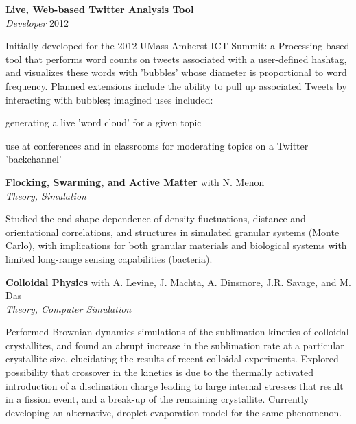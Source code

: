 \documentclass[10pt]{article}
\newcommand{\blankline}{\quad\pagebreak[3]}
\newcommand{\halfblankline}{\quad\vspace{-0.5\baselineskip}\pagebreak[3]}
\begin{document}
\blankline

\href{http://dwblair.github.io}{\textbf{Live, Web-based Twitter Analysis Tool }}\\
\emph{Developer} \hfill {2012}

\halfblankline

Initially developed for the 2012 UMass Amherst ICT Summit: a Processing-based tool that performs word counts on tweets associated with a user-defined hashtag, and visualizes these words with 'bubbles' whose diameter is proportional to word frequency. Planned extensions include the ability to pull up associated Tweets by interacting with bubbles; imagined uses included: 
 \begin{innerlist}
        \item generating a live 'word cloud' for a given topic
\item use at conferences and in classrooms for moderating topics on a Twitter 'backchannel' 
\end{innerlist}


\blankline

\href{http://dwblair.github.io}{\textbf{Flocking, Swarming, and Active Matter}} \hfill {with N. Menon} \\
\emph{Theory, Simulation}

\halfblankline

Studied the end-shape dependence of density fluctuations, distance and orientational correlations, and structures in simulated granular systems (Monte Carlo), with implications for both granular materials and biological systems with limited long-range sensing capabilities (bacteria). 

\blankline

\href{http://dwblair.github.io}{\textbf{Colloidal Physics}} \hfill {with A. Levine, J. Machta, A. Dinsmore, J.R. Savage, and M. Das} \\
\emph{Theory, Computer Simulation} 

\halfblankline

Performed Brownian dynamics simulations of the sublimation kinetics of colloidal crystallites, and found an abrupt increase in the sublimation rate at a particular crystallite size, elucidating the results of
recent colloidal experiments. Explored possibility that crossover in the kinetics is due to the thermally activated
introduction of a disclination charge leading to large internal stresses that result in a fission event, and a
break-up of the remaining crystallite. Currently developing an alternative, droplet-evaporation
model for the same phenomenon.
\end{document}
